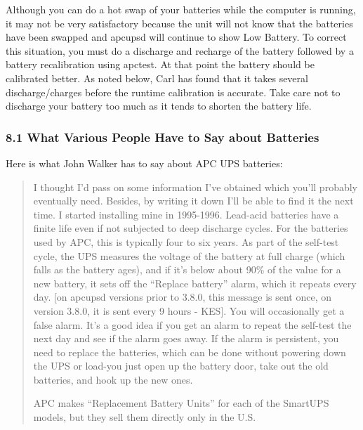{{{{{{{{{Although you can do a hot swap of your batteries while the computer is
running, it may not be very satisfactory because the unit will not know that
the batteries have been swapped and apcupsd will continue to show Low Battery.
To correct this situation, you must do a discharge and recharge of the
battery followed by a battery recalibration using apctest.  At that point the
battery should be calibrated better.  As noted below, Carl has found that it
takes several discharge/charges before the runtime calibration is accurate. 
Take care not to discharge your battery too much as it tends to shorten the
battery life. 

\label{What-Various-People-Have-to-Say-about-Batteries}

\subsubsection*{8.1 What Various People Have to Say about Batteries}

\label{index-Batteries-145}
Here is what John Walker has to say about APC UPS batteries:  

\begin{quote}

I thought I'd pass on some information I've obtained which you'll probably
eventually need. Besides, by writing it down I'll be able to find it the next
time. I started installing mine in 1995-1996. Lead-acid batteries have a
finite life even if not subjected to deep discharge cycles. For the batteries
used by APC, this is typically four to six years. As part of the self-test
cycle, the UPS measures the voltage of the battery at full charge (which falls
as the battery ages), and if it's below about 90\% of the value for a new
battery, it sets off the ``Replace battery'' alarm, which it repeats every
day. [on apcupsd versions prior to 3.8.0, this message is sent once, on
version 3.8.0, it is sent every 9 hours - KES]. You will occasionally get a
false alarm. It's a good idea if you get an alarm to repeat the self-test the
next day and see if the alarm goes away. If the alarm is persistent, you need
to replace the batteries, which can be done without powering down the UPS or
load-you just open up the battery door, take out the old batteries, and hook
up the new ones.  

APC makes ``Replacement Battery Units'' for each of the SmartUPS models, but
they sell them directly only in the U.S.  


\end{quote}}}}}}}}}}

